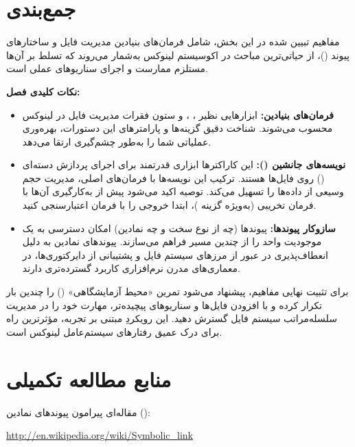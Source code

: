 \section{جمع‌بندی}

مفاهیم تبیین شده در این بخش، شامل فرمان‌های بنیادین مدیریت فایل و ساختارهای پیوند ()، از حیاتی‌ترین مباحث در اکوسیستم لینوکس به‌شمار می‌روند که تسلط بر آن‌ها مستلزم ممارست و اجرای سناریوهای عملی است.

\textbf{نکات کلیدی فصل:}

\begin{itemize}
  \item \textbf{فرمان‌های بنیادین:} ابزارهایی نظیر ، ،  و  ستون فقرات مدیریت فایل در لینوکس محسوب می‌شوند. شناخت دقیق گزینه‌ها و پارامترهای این دستورات، بهره‌وری عملیاتی شما را به‌طور چشم‌گیری ارتقا می‌دهد.

  \item \textbf{نویسه‌های جانشین ():} این کاراکترها ابزاری قدرتمند برای اجرای پردازش دسته‌ای () روی فایل‌ها هستند. ترکیب این نویسه‌ها با فرمان‌های اصلی، مدیریت حجم وسیعی از داده‌ها را تسهیل می‌کند. توصیه اکید می‌شود پیش از به‌کارگیری آن‌ها با فرمان تخریبی  (به‌ویژه گزینه )، ابتدا خروجی را با فرمان  اعتبارسنجی کنید.

  \item \textbf{سازوکار پیوندها:} پیوندها (چه از نوع سخت و چه نمادین) امکان دسترسی به یک موجودیت واحد را از چندین مسیر فراهم می‌سازند. پیوندهای نمادین به دلیل انعطاف‌پذیری در عبور از مرزهای سیستم فایل و پشتیبانی از دایرکتوری‌ها، در معماری‌های مدرن نرم‌افزاری کاربرد گسترده‌تری دارند.
\end{itemize}

برای تثبیت نهایی مفاهیم، پیشنهاد می‌شود تمرین «محیط آزمایشگاهی» () را چندین بار تکرار کرده و با افزودن فایل‌ها و سناریوهای پیچیده‌تر، مهارت خود را در مدیریت سلسله‌مراتب سیستم فایل گسترش دهید. این رویکردِ مبتنی بر تجربه، مؤثرترین راه برای درک عمیق رفتارهای سیستم‌عامل لینوکس است.

\section{منابع مطالعه تکمیلی}

مقاله‌ای پیرامون پیوندهای نمادین ():

\begin{latin}
\url{http://en.wikipedia.org/wiki/Symbolic_link}
\end{latin}
